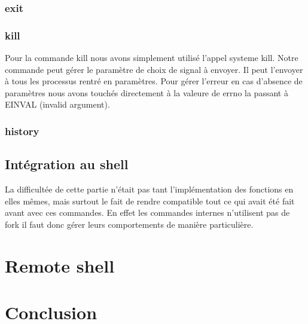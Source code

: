 \documentclass[12pt]{article}
\begin{document}
 \subsubsection{exit}
 
 \subsubsection{kill}
 Pour la commande kill nous avons simplement utilisé l'appel systeme kill. Notre commande
 peut gérer le paramètre de choix de signal à envoyer. Il peut l'envoyer à tous les processus
 rentré en paramètres.
 Pour gérer l'erreur en cas d'absence de paramètres nous avons touchés directement à la valeure
 de errno la passant à EINVAL (invalid argument).
 
 \subsubsection{history}
 
 \subsection{Intégration au shell}
 
 La difficultée de cette partie n'était pas tant l'implémentation des fonctions en elles mêmes,
 mais surtout le fait de rendre compatible tout ce qui avait été fait avant avec ces commandes.
 En effet les commandes internes n'utilisent pas de fork il faut donc gérer leurs comportements
 de manière particulière.

\newpage
\section{Remote shell}


\newpage
\section{Conclusion}
\end{document}
